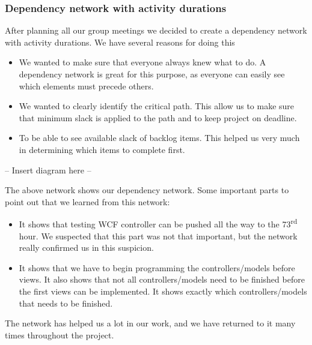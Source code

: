 \subsubsection{Dependency network with activity durations}
After planning all our group meetings we decided to create a dependency network with activity durations. We have several reasons for doing this
\begin{itemize}
	\item We wanted to make sure that everyone always knew what to do. A dependency network is great for this purpose, as everyone can easily see which elements must precede others.
	\item We wanted to clearly identify the critical path. This allow us to make sure that minimum slack is applied to the path and to keep project on deadline.
	\item To be able to see available slack of backlog items. This helped us very much in determining which items to complete first.
\end{itemize}

-- Insert diagram here --

The above network shows our dependency network.
Some important parts to point out that we learned from this network:
\begin{itemize}
	\item It shows that testing WCF controller can be pushed all the way to the 73\textsuperscript{rd} hour. We suspected that this part was not that important, but the network really confirmed us in this suspicion.
	\item It shows that we have to begin programming the controllers/models before views. It also shows that not all controllers/models need to be finished before the first views can be implemented. It shows exactly which controllers/models that needs to be finished.
\end{itemize}

The network has helped us a lot in our work, and we have returned to it many times throughout the project.
